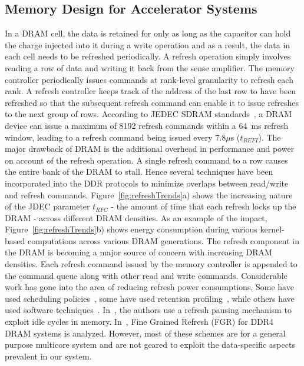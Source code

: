 \subsection{Memory Design for Accelerator Systems}

In a DRAM cell, the data is retained for only as long as the capacitor can hold the charge injected into it during a write operation and as a result, the data in each cell needs to be refreshed periodically. A refresh operation simply involves reading a row of data and writing it back from the sense amplifier. The memory controller periodically issues commands at rank-level granularity to refresh each rank. A refresh controller keeps track of the address of the last row to have been refreshed so that the subsequent refresh command can enable it to issue refreshes to the next group of rows. According to JEDEC SDRAM standards~\cite{jedec-sdram-standards}, a DRAM device can issue a maximum of 8192 refresh commands within a 64~ms refresh window, leading to a refresh command being issued every 7.8$\mu$s ($t_{REFI}$). The major drawback of DRAM is the additional overhead in performance and power on account of the refresh operation. A single refresh command to a row causes the entire bank of the DRAM to stall. Hence several techniques have been incorporated into the DDR protocols to minimize overlaps between read/write and refresh commands. Figure~\ref{fig:refreshTrends}a) shows the increasing nature of the JDEC parameter $t_{RFC}$ - the amount of time that each refresh locks up the DRAM - across different DRAM densities. As an example of the impact, Figure~\ref{fig:refreshTrends}b) shows energy consumption during various kernel-based computations across various DRAM generations. The refresh component in the DRAM is becoming a major source of concern with increasing DRAM densities. Each refresh command issued by the memory controller is appended to the command queue along with other read and write commands.  
Considerable work has gone into the area of reducing refresh power consumptions. Some have used scheduling policies~\cite{Stuecheli2010}, some have used retention profiling~\cite{Liu2012}, while others have used software techniques~\cite{Liu2012}. In~\cite{Nair2013}, the authors use a refresh pausing mechanism to exploit idle cycles in memory. In~\cite{Mukundan2013}, Fine Grained Refresh (FGR) for DDR4 DRAM systems is analyzed. 
However, most of these schemes are for a general purpose multicore system and are not geared to exploit the data-specific aspects prevalent in our system. 

